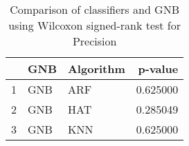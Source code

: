 \begin{table}
\footnotesize
\caption{Comparison of classifiers and GNB using Wilcoxon signed-rank test for Precision}
\label{tab:GNB wilcoxon Precision comparison}
\begin{tabular}{lllr}
\hline
 & GNB & Algorithm & p-value \\
\hline
1 & GNB & ARF & 0.625000 \\
2 & GNB & HAT & 0.285049 \\
3 & GNB & KNN & 0.625000 \\
\hline
\end{tabular}
\end{table}
